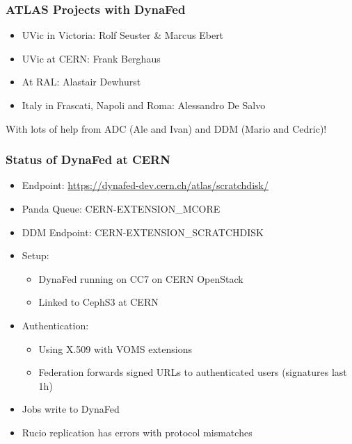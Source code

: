 \documentclass{beamer}
\begin{document}
\begin{frame}
  \frametitle{ATLAS Projects with DynaFed}
  \begin{itemize}
    \item UVic in Victoria: Rolf Seuster \& Marcus Ebert
    \item UVic at CERN: Frank Berghaus
    \item At RAL: Alastair Dewhurst
    \item Italy in Frascati, Napoli and Roma: Alessandro De Salvo
  \end{itemize}
  With lots of help from ADC (Ale and Ivan) and DDM (Mario and Cedric)!
\end{frame}

\begin{frame}
  \frametitle{Status of DynaFed at CERN}
  \begin{itemize}
    \item Endpoint: \url{https://dynafed-dev.cern.ch/atlas/scratchdisk/}
    \item Panda Queue: CERN-EXTENSION\_MCORE
		\item DDM Endpoint: CERN-EXTENSION\_SCRATCHDISK
    \item Setup:
    \begin{itemize}
      \item DynaFed running on CC7 on CERN OpenStack
      \item Linked to CephS3 at CERN
    \end{itemize}
		\item Authentication:
    \begin{itemize}
      \item Using X.509 with VOMS extensions
      \item Federation forwards signed URLs to authenticated users (signatures last 1h)
    \end{itemize}
    \item Jobs write to DynaFed
    \item Rucio replication has errors with protocol mismatches
  \end{itemize}
\end{frame}
\end{document}
